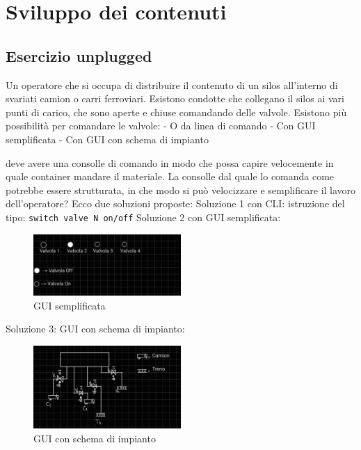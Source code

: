 \section{Sviluppo dei contenuti}

\subsection{Esercizio unplugged}
Un operatore che si occupa di distribuire il contenuto di  un silos all'interno di svariati camion o carri ferroviari. Esistono condotte che collegano il silos ai vari punti di carico, che sono aperte e chiuse comandando delle valvole. 
Esistono più possibilità per comandare le valvole:
- O da linea di comando 
- Con GUI semplificata
- Con GUI con schema di impianto

deve avere una consolle di comando in modo che possa capire velocemente in quale container mandare il materiale.
La consolle dal quale lo comanda come potrebbe essere strutturata, in che modo si può velocizzare e semplificare il lavoro dell'operatore?
Ecco due soluzioni proposte:
Soluzione  1 con CLI: istruzione del tipo: \texttt{switch valve N on/off} \newline
Soluzione 2 con GUI semplificata:
\begin{figure}
  \centering
  \includegraphics[width=0.5\textwidth]{img/gui_sempl.png}
  \caption{GUI semplificata}
\end{figure}


Soluzione 3: GUI con schema di impianto:
\begin{figure}
  \centering
  \includegraphics[width=0.5\textwidth]{img/gui_con_schema.png}
  \caption{GUI con schema di impianto}
\end{figure}

\newpage

